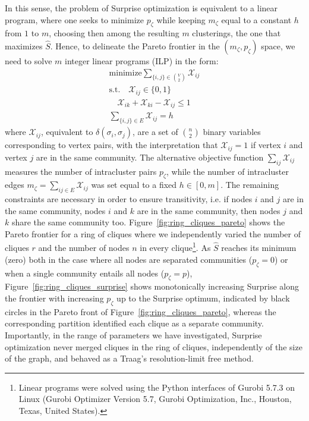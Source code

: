 In this sense, the problem of Surprise optimization is equivalent to a linear program, where one seeks to minimize $p_\zeta$ while keeping $m_\zeta$ equal to a constant $h$ from $1$ to $m$, choosing then among the resulting $m$ clusterings, the one that maximizes $\hat{S}$.
Hence, to delineate the Pareto frontier in the $(m_\zeta,p_\zeta)$ space, we need to solve $m$ integer linear programs (ILP) in the form:
\begin{align}\label{eq:surprise_ilp}
\textrm{minimize} \sum_{\{i,j\} \in \binom{V}{2}} \mathcal{X}_{ij} \nonumber \\
\textrm{s.t.} \quad \mathcal{X}_{ij} \in \{0,1 \} \nonumber \\
\quad \mathcal{X}_{ik} + \mathcal{X}_{ki} - \mathcal{X}_{ij} \leq 1 \nonumber \\
\sum_{\{i,j\} \in E} \mathcal{X}_{ij}=h \nonumber
\end{align}
where $\mathcal{X}_{ij}$, equivalent to $\delta(\sigma_i, \sigma_j)$, are a set of $\binom{n}{2}$ binary variables corresponding to vertex pairs, with the interpretation that $\mathcal{X}_{ij}=1$ if vertex $i$ and vertex $j$ are in the same community. The alternative objective function $\sum_{ij}\mathcal{X}_{ij}$ measures the number of intracluster pairs $p_\zeta$, while the number of intracluster edges $m_\zeta=\sum_{ij \in E} \mathcal{X}_{ij}$ was set equal to a fixed $h \in [0,m]$. The remaining constraints are necessary in order to ensure transitivity, i.e. if nodes $i$ and $j$ are in the same community, nodes $i$ and $k$ are in the same community, then nodes $j$ and $k$ share the same community too. 
Figure~\ref{fig:ring_cliques_pareto} shows the Pareto frontier for a ring of cliques where we independently varied the number of cliques $r$ and the number of nodes $n$ in every clique\footnote{Linear programs were solved using the Python interfaces of Gurobi 5.7.3 on Linux (Gurobi Optimizer Version 5.7, Gurobi Optimization, Inc., Houston, Texas, United States).}.
As $\hat{S}$ reaches its minimum (zero) both in the case where all nodes are separated communities ($p_\zeta=0$) or when a single community entails all nodes ($p_\zeta=p$), Figure~\ref{fig:ring_cliques_surprise} shows monotonically increasing Surprise along the frontier with increasing $p_\zeta$ up to the Surprise optimum, indicated by black circles in the Pareto front of Figure~\ref{fig:ring_cliques_pareto}, whereas the corresponding partition identified each clique as a separate community.
Importantly, in the range of parameters we have investigated, Surprise optimization never merged cliques in the ring of cliques, independently of the size of the graph, and behaved as a Traag's resolution-limit free method.

